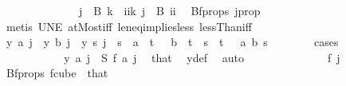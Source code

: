 \begin{isabellebody}
\ \ \ \ \isamarkupfalse%
\ {\isacharminus}{\kern0pt}\isanewline
\ \ \ \ \ \ \isamarkupfalse%
\ {\isachardoublequoteopen}j\ {\isasymin}\ B\ k{\isachardoublequoteclose}\ {\isacharbar}{\kern0pt}\ {\isachardoublequoteopen}{\isasymexists}ii{\isacharless}{\kern0pt}k{\isachardot}{\kern0pt}\ j\ {\isasymin}\ B\ ii{\isachardoublequoteclose}\ \isamarkupfalse%
\ Bf{\isacharunderscore}{\kern0pt}props{\isacharparenleft}{\kern0pt}{}{\isacharparenright}{\kern0pt}\ j{\isacharunderscore}{\kern0pt}prop\ \isanewline
\ \ \ \ \ \ \ \ \isamarkupfalse%
\ {\isacharparenleft}{\kern0pt}metis\ UN{\isacharunderscore}{\kern0pt}E\ atMost{\isacharunderscore}{\kern0pt}iff\ le{\isacharunderscore}{\kern0pt}neq{\isacharunderscore}{\kern0pt}implies{\isacharunderscore}{\kern0pt}less\ lessThan{\isacharunderscore}{\kern0pt}iff{\isacharparenright}{\kern0pt}\isanewline
\ \ \ \ \ \ \isamarkupfalse%
\ \isamarkupfalse%
\ {\isachardoublequoteopen}y\ a\ j\ {\isacharequal}{\kern0pt}\ y\ b\ j\ {\isasymor}\ y\ s\ j\ {\isacharequal}{\kern0pt}\ s{\isachardoublequoteclose}\ \ {\isachardoublequoteopen}a\ {\isacharless}{\kern0pt}\ t\ {\isacharplus}{\kern0pt}\ {}{\isachardoublequoteclose}\ {\isachardoublequoteopen}b\ {\isacharless}{\kern0pt}\ t\ {\isacharplus}{\kern0pt}{}{\isachardoublequoteclose}\ {\isachardoublequoteopen}s\ {\isacharless}{\kern0pt}\ t\ {\isacharplus}{\kern0pt}{}{\isachardoublequoteclose}\ \ a\ b\ s\isanewline
\ \ \ \ \ \ \isamarkupfalse%
\ cases\isanewline
\ \ \ \ \ \ \ \ \isamarkupfalse%
\ {}\isanewline
\ \ \ \ \ \ \ \ \isamarkupfalse%
\ \isamarkupfalse%
\ {\isachardoublequoteopen}y\ a\ j\ {\isacharequal}{\kern0pt}\ S\ {\isacharparenleft}{\kern0pt}{\isacharquery}{\kern0pt}f\ a{\isacharparenright}{\kern0pt}\ j{\isachardoublequoteclose}\ \isamarkupfalse%
\ that{\isacharparenleft}{\kern0pt}{}{\isacharparenright}{\kern0pt}\ \isamarkupfalse%
\ y{\isacharunderscore}{\kern0pt}def\ \isamarkupfalse%
\ auto\isanewline
\ \ \ \ \ \ \ \ \isamarkupfalse%
\ \isamarkupfalse%
\ {\isachardoublequoteopen}\ {\isachardot}{\kern0pt}{\isachardot}{\kern0pt}{\isachardot}{\kern0pt}\ {\isacharequal}{\kern0pt}\ f\ j{\isachardoublequoteclose}\ \isamarkupfalse%
\ Bf{\isacharunderscore}{\kern0pt}props{\isacharparenleft}{\kern0pt}{}{\isacharparenright}{\kern0pt}\ f{\isacharunderscore}{\kern0pt}cube\ {}\ that{\isacharparenleft}{\kern0pt}{}{\isacharparenright}{\kern0pt}\ \isamarkupfalse%

\end{isabellebody}
